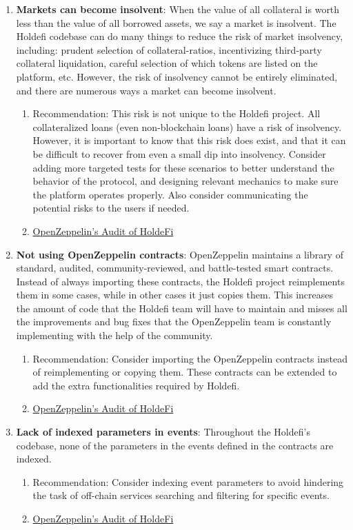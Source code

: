 \begin{enumerate}
\item\textbf{Markets can become insolvent}: When the value of all collateral is worth less than the value of all borrowed assets, we say a market is insolvent. The Holdefi codebase can do many things to reduce the risk of market insolvency, including: prudent selection of collateral-ratios, incentivizing third-party collateral liquidation, careful selection of which tokens are listed on the platform, etc. However, the risk of insolvency cannot be entirely eliminated, and there are numerous ways a market can become insolvent.
	\begin{enumerate}
	\item Recommendation: This risk is not unique to the Holdefi project. All collateralized loans (even non-blockchain loans) have a risk of insolvency. However, it is important to know that this risk does exist, and that it can be difficult to recover from even a small dip into insolvency. Consider adding more targeted tests for these scenarios to better understand the behavior of the protocol, and designing relevant mechanics to make sure the platform operates properly. Also consider communicating the potential risks to the users if needed.
	\item\href{https://blog.openzeppelin.com/holdefi-audit}{OpenZeppelin's Audit of HoldeFi}
	\end{enumerate}

\item\textbf{Not using OpenZeppelin contracts}: OpenZeppelin maintains a library of standard, audited, community-reviewed, and battle-tested smart contracts. Instead of always importing these contracts, the Holdefi project reimplements them in some cases, while in other cases it just copies them. This increases the amount of code that the Holdefi team will have to maintain and misses all the improvements and bug fixes that the OpenZeppelin team is constantly implementing with the help of the community.
	\begin{enumerate}
	\item Recommendation: Consider importing the OpenZeppelin contracts instead of reimplementing or copying them. These contracts can be extended to add the extra functionalities required by Holdefi.
	\item\href{https://blog.openzeppelin.com/holdefi-audit}{OpenZeppelin's Audit of HoldeFi}
	\end{enumerate}

\item\textbf{Lack of indexed parameters in events}: Throughout the Holdefi’s codebase, none of the parameters in the events defined in the contracts are indexed.
	\begin{enumerate}
	\item Recommendation: Consider indexing event parameters to avoid hindering the task of off-chain services searching and filtering for specific events.
	\item\href{https://blog.openzeppelin.com/holdefi-audit}{OpenZeppelin's Audit of HoldeFi}
	\end{enumerate}


\end{enumerate}

